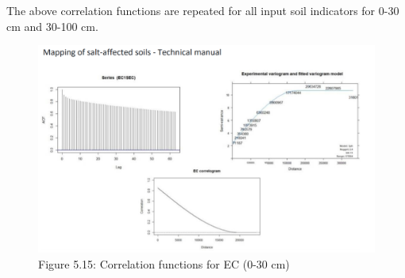 \documentclass[
  10pt,
  b5paper,
]{book}
\begin{document}
The above correlation functions are repeated for all input soil indicators for 0-30 cm and 30-100 cm.

\begin{figure}
\centering
\includegraphics{figures/images/Figure5.15.PNG}
\caption{Figure 5.15: Correlation functions for EC (0-30 cm)}
\end{figure}
\end{document}
